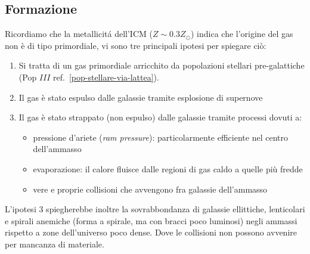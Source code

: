 \subsection{Formazione}
Ricordiamo che la metallicitá dell'ICM ($Z\sim 0.3 Z_{\odot}$) indica che l'origine del gas non è di tipo primordiale, vi sono tre principali ipotesi per spiegare ciò:

\begin{enumerate}
    \item Si tratta di un gas primordiale arricchito da popolazioni stellari pre-galattiche (Pop $III$ ref.~\ref{pop-stellare-via-lattea}).
    \item Il gas è stato espulso dalle galassie tramite esplosione di supernove
    \item Il gas è stato strappato (non espulso) dalle galassie tramite processi dovuti a:
    \begin{itemize}
        \item pressione d'ariete (\emph{ram pressure}): particolarmente efficiente nel centro dell'ammasso
        \item evaporazione: il calore fluisce dalle regioni di gas caldo a quelle più fredde
        \item vere e proprie collisioni che avvengono fra galassie dell'ammasso
    \end{itemize}
\end{enumerate}

L'ipotesi $3$ spiegherebbe inoltre la sovrabbondanza di galassie ellittiche, lenticolari e spirali anemiche (forma a spirale, ma con bracci poco luminosi) negli ammassi rispetto a zone dell'universo poco dense. Dove le collisioni non possono avvenire per mancanza di materiale.

